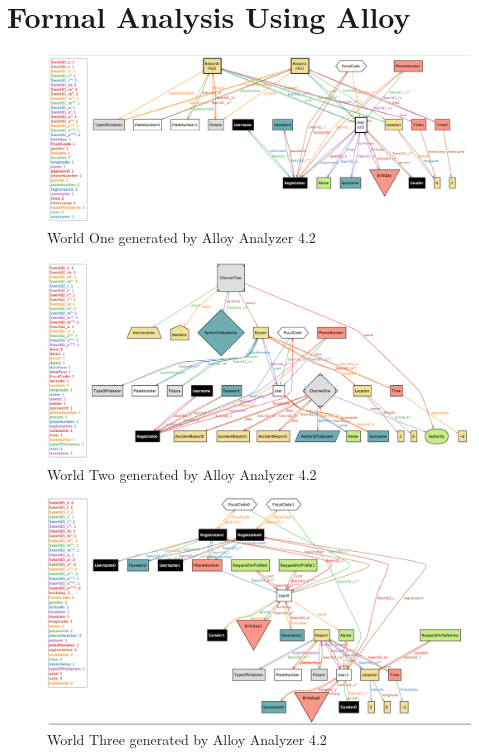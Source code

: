 \section{Formal Analysis Using Alloy}
	
	
	\begin{figure}[H]	
		\centering
		\includegraphics[scale=0.35]{images/World1.png}
		\caption{World One generated by Alloy Analyzer 4.2}
	\end{figure}
	
	\begin{figure}[H]	
		\centering
		\includegraphics[scale=0.35]{images/World2.png}
		\caption{World Two generated by Alloy Analyzer 4.2}
	\end{figure}
	
	\begin{figure}[H]	
		\centering
		\includegraphics[scale=0.35]{images/World3.png}
		\caption{World Three generated by Alloy Analyzer 4.2}
	\end{figure}
	
